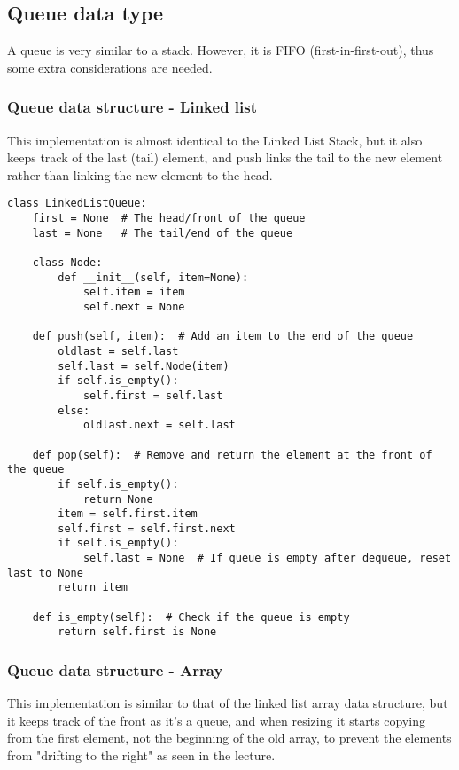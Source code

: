 \documentclass{article}
\begin{document}
\subsection{Queue data type}

A queue is very similar to a stack. However, it is FIFO (first-in-first-out), thus some extra considerations are needed.

\subsubsection{Queue data structure - Linked list}

This implementation is almost identical to the Linked List Stack, but it also keeps track of the last (tail) element, and push links the tail to the new element rather than linking the new element to the head.

\begin{verbatim}
class LinkedListQueue:
    first = None  # The head/front of the queue
    last = None   # The tail/end of the queue
    
    class Node:
        def __init__(self, item=None):
            self.item = item
            self.next = None

    def push(self, item):  # Add an item to the end of the queue
        oldlast = self.last
        self.last = self.Node(item)
        if self.is_empty():
            self.first = self.last
        else:
            oldlast.next = self.last
            
    def pop(self):  # Remove and return the element at the front of the queue
        if self.is_empty():
            return None
        item = self.first.item
        self.first = self.first.next
        if self.is_empty():
            self.last = None  # If queue is empty after dequeue, reset last to None
        return item

    def is_empty(self):  # Check if the queue is empty
        return self.first is None

\end{verbatim}

\subsubsection{Queue data structure - Array}

This implementation is similar to that of the linked list array data structure, but it keeps track of the front as it's a queue, and when resizing it starts copying from the first element, not the beginning of the old array, to prevent the elements from "drifting to the right" as seen in the lecture.
\end{document}
